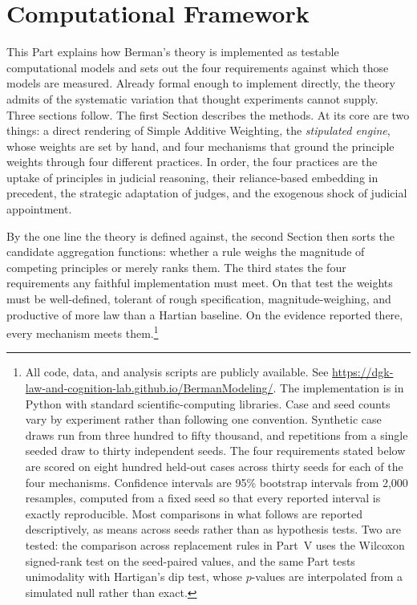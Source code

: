 \section{Computational Framework}

This Part explains how Berman's theory is implemented as testable
computational models and sets out the four requirements against which those
models are measured. Already formal enough to implement directly, the theory admits of the
systematic variation that thought experiments cannot supply. Three sections
follow. The first Section describes the methods. At its core are two things: a direct rendering of Simple Additive
Weighting, the \textit{stipulated engine}, whose weights are set by hand,
and four mechanisms that ground the principle weights through four
different practices. In order, the four practices are the uptake of principles in judicial
reasoning, their reliance-based embedding in precedent, the
strategic adaptation of judges, and the exogenous shock of judicial
appointment.

By the one line the theory is defined against, the second Section then
sorts the candidate aggregation functions: whether a rule weighs the
magnitude of competing principles or merely ranks them. The third states the four requirements any faithful implementation must
meet. On that test the weights must be well-defined, tolerant of rough
specification, magnitude-weighing, and productive of more law than a Hartian baseline. On the
evidence reported there, every mechanism meets them.\footnote{All code, data, and analysis scripts are
publicly available. See
\url{https://dgk-law-and-cognition-lab.github.io/BermanModeling/}. The
implementation is in Python with standard scientific-computing libraries.
Case and seed counts vary by experiment rather than following one convention.
Synthetic case draws run from three hundred to fifty thousand, and repetitions
from a single seeded draw to thirty independent seeds. The four requirements
stated below are scored on eight hundred held-out cases across thirty seeds
for each of the four mechanisms. Confidence intervals are 95\% bootstrap
intervals from 2{,}000 resamples, computed from a fixed seed so that every
reported interval is exactly reproducible. Most comparisons in what follows
are reported descriptively, as means across seeds rather than as hypothesis
tests. Two are tested: the comparison across replacement rules in Part~V uses
the Wilcoxon signed-rank test on the seed-paired values, and the same Part
tests unimodality with Hartigan's dip test, whose $p$-values are interpolated
from a simulated null rather than exact.}

